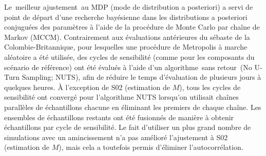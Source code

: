\documentclass[11pt]{book}
\newcommand{\angL}{\guillemotleft\,}
\newcommand{\angR}{\,\guillemotright}
\begin{document}
Le \angL{}meilleur ajustement\angR{} au MDP (mode de distribution a posteriori) a servi de point de d\'{e}part d'une recherche bay\'{e}sienne dans les distributions a posteriori conjugu\'{e}es des param\`{e}tres \`{a} l'aide de la proc\'{e}dure de Monte Carlo par cha\^{i}ne de Markov (MCCM).
Contrairement aux \'{e}valuations ant\'{e}rieures du s\'{e}baste de la Colombie-Britannique, pour lesquelles une proc\'{e}dure de Metropolis \`{a} marche al\'{e}atoire a \'{e}t\'{e} utilis\'{e}e, des cycles de sensibilit\'{e} (comme pour les composants du sc\'{e}nario de r\'{e}f\'{e}rence) ont \'{e}t\'{e} \'{e}valu\'{e}s \`{a} l'aide d'un algorithme \angL{}sans retour\angR{} (No U-Turn Sampling; NUTS), afin de r\'{e}duire le temps d'\'{e}valuation de plusieurs jours \`{a} quelques heures. 
\`{A} l'exception de S02 (estimation de $M$), tous les cycles de sensibilit\'{e} ont converg\'{e} pour l'algorithme NUTS lorsqu'on utilisait \nChains{} cha\^{i}nes parall\`{e}les de \cSims{} \'{e}chantillons chacune en \'{e}liminant les \cBurn{} premiers de chaque cha\^{i}ne. 
Les \nChains{} ensembles de \cSamps{} \'{e}chantillons restants ont \'{e}t\'{e} fusionn\'{e}s de mani\`{e}re \`{a} obtenir \Nmcmc{} \'{e}chantillons par cycle de sensibilit\'{e}.
Le fait d'utiliser un plus grand nombre de simulations avec un amincissement n'a pas am\'{e}lior\'{e} l'ajustement \`{a} S02 (estimation de $M$), mais cela a toutefois permis d'\'{e}liminer l'autocorr\'{e}lation.
\end{document}
